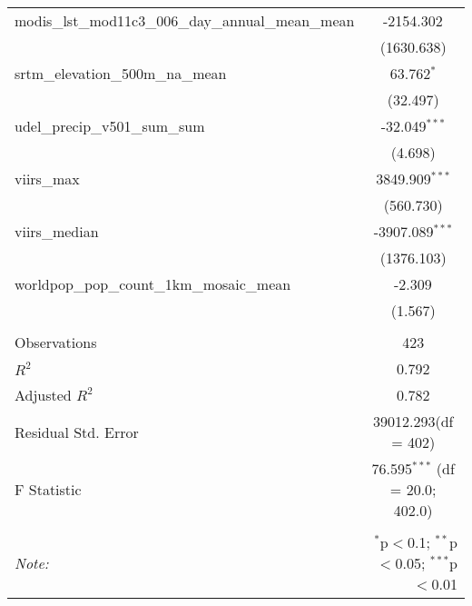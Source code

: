 \begin{table}[!htbp]
\begin{tabular}{@{\extracolsep{5pt}}lc}
 modis_lst_mod11c3_006_day_annual_mean_mean & -2154.302$^{}$ \\
  & (1630.638) \\
 srtm_elevation_500m_na_mean & 63.762$^{*}$ \\
  & (32.497) \\
 udel_precip_v501_sum_sum & -32.049$^{***}$ \\
  & (4.698) \\
 viirs_max & 3849.909$^{***}$ \\
  & (560.730) \\
 viirs_median & -3907.089$^{***}$ \\
  & (1376.103) \\
 worldpop_pop_count_1km_mosaic_mean & -2.309$^{}$ \\
  & (1.567) \\
\hline \\[-1.8ex]
 Observations & 423 \\
 $R^2$ & 0.792 \\
 Adjusted $R^2$ & 0.782 \\
 Residual Std. Error & 39012.293(df = 402)  \\
 F Statistic & 76.595$^{***}$ (df = 20.0; 402.0) \\
\hline
\hline \\[-1.8ex]
\textit{Note:} & \multicolumn{1}{r}{$^{*}$p$<$0.1; $^{**}$p$<$0.05; $^{***}$p$<$0.01} \\
\end{tabular}
\end{table}